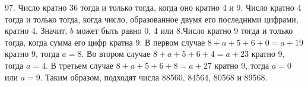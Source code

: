 97. Число кратно 36 тогда и только тогда, когда оно кратно 4 и 9. Число кратно 4 тогда и только тогда, когда число, образованное двумя его последними цифрами, кратно 4. Значит, $b$ может быть равно 0, 4 или 8.Число кратно 9 тогда и только тогда, когда сумма его цифр кратна 9. В первом случае $8+a+5+6+0=a+19$ кратно 9, тогда $a=8.$ Во втором случае $8+a+5+6+4=a+23$ кратно 9, тогда $a=4.$ В третьем случае $8+a+5+6+8=a+27$ кратно 9, тогда $a=0$ или $a=9.$ Таким образом, подходят числа 88560, 84564, 80568 и 89568.\\
